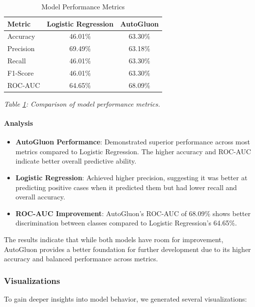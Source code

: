 \documentclass{article}
\begin{document}
\begin{table}[H]
\centering
\caption{Model Performance Metrics}
\label{tab:model_performance}
\begin{tabular}{lcc}
\toprule
\textbf{Metric} & \textbf{Logistic Regression} & \textbf{AutoGluon} \\
\midrule
Accuracy & 46.01\% & 63.30\% \\
Precision & 69.49\% & 63.18\% \\
Recall & 46.01\% & 63.30\% \\
F1-Score & 46.01\% & 63.30\% \\
ROC-AUC & 64.65\% & 68.09\% \\
\bottomrule
\end{tabular}
\end{table}

\textit{Table \ref{tab:model_performance}: Comparison of model performance metrics.}

\paragraph{Analysis}

\begin{itemize}[leftmargin=*]
    \item \textbf{AutoGluon Performance}: Demonstrated superior performance across most metrics compared to Logistic Regression. The higher accuracy and ROC-AUC indicate better overall predictive ability.
    \item \textbf{Logistic Regression}: Achieved higher precision, suggesting it was better at predicting positive cases when it predicted them but had lower recall and overall accuracy.
    \item \textbf{ROC-AUC Improvement}: AutoGluon's ROC-AUC of 68.09\% shows better discrimination between classes compared to Logistic Regression's 64.65\%.
\end{itemize}

The results indicate that while both models have room for improvement, AutoGluon provides a better foundation for further development due to its higher accuracy and balanced performance across metrics.

\subsubsection{Visualizations}

To gain deeper insights into model behavior, we generated several visualizations:
\end{document}
